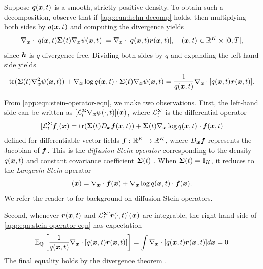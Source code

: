 Suppose $q(\boldsymbol{x}, t)$ is a smooth, strictly positive density.
To obtain such a decomposition, observe that if \cref{app:eqn:helm-decomp} holds, then multiplying both sides by $q(\boldsymbol{x}, t)$ and computing the divergence yields
\begin{equation}
     \nabla_{\boldsymbol{x}} \cdot [q(\boldsymbol{x}, t) \boldsymbol{\Sigma}(t) \nabla_{\boldsymbol{x}} \psi(\boldsymbol{x}, t)]
     =
     \nabla_{\boldsymbol{x}} \cdot [q(\boldsymbol{x}, t) \boldsymbol{r}(\boldsymbol{x}, t)],
     \quad
     (\boldsymbol{x}, t) \in \mathbb{R}^K \times [0, T],
\end{equation}
since $\boldsymbol{h}$ is $q$-divergence-free. 
Dividing both sides by $q$ and expanding the left-hand side yields
\begin{equation}\label{app:eqn:stein-operator-eqn}
    \mathrm{tr}(\boldsymbol{\Sigma}(t) \nabla_{\boldsymbol{x}}^2 \psi(\boldsymbol{x}, t))
    +
    \nabla_{\boldsymbol{x}} \log q(\boldsymbol{x}, t) \cdot
    \boldsymbol{\Sigma}(t) \nabla_{\boldsymbol{x}} \psi(\boldsymbol{x}, t)
    =
    \frac{1}{q(\boldsymbol{x}, t)}
    \nabla_{\boldsymbol{x}} \cdot [q(\boldsymbol{x}, t) \boldsymbol{r}(\boldsymbol{x}, t)] .
\end{equation}

From \cref{app:eqn:stein-operator-eqn}, we make two observations. First, the left-hand side can be written as $[\mathcal{L}_t^{\boldsymbol{\Sigma}}\nabla_{\boldsymbol{x}}\psi(\cdot,t)](\boldsymbol{x})$, where $\mathcal{L}_t^{\boldsymbol{\Sigma}}$ is the differential operator
\begin{equation}\label{app:eqn:diffusion-stein}
    [\mathcal{L}_t^{\boldsymbol{\Sigma}}\boldsymbol{f}](\boldsymbol{x}) = \mathrm{tr}(\boldsymbol{\Sigma}(t) D_{\boldsymbol{x}} \boldsymbol{f} (\boldsymbol{x}, t))
    +
    \boldsymbol{\Sigma}(t) \nabla_{\boldsymbol{x}} \log q(\boldsymbol{x}, t) \cdot
    \boldsymbol{f}(\boldsymbol{x}, t)
\end{equation}
defined for differentiable vector fields $\boldsymbol{f}: \mathbb{R}^K \to \mathbb{R}^K$, where $D_{\boldsymbol{x}} \boldsymbol{f}$ represents the Jacobian of $\boldsymbol{f}$.
This is the \emph{diffusion Stein operator} corresponding to the density $q(\boldsymbol{x},t)$ and constant covariance coefficient $\boldsymbol{\Sigma}(t)$ \citep{barbour1990stein,gorham2019measuring}. 
When $\boldsymbol{\Sigma}(t)=\mathbb{I}_K$, it reduces to the \emph{Langevin Stein} operator
\begin{equation*}
    [\cL_t \mbf](\mbx) = \nabla_{\mbx} \cdot \mbf(\mbx)  + \nabla_{\mbx} \log q(\mbx, t) \cdot \mbf(\mbx).
\end{equation*}
We refer the reader to \citet{gorham2019measuring} for background on diffusion Stein operators.

Second, whenever $\boldsymbol{r}(\boldsymbol{x}, t)$ and
$\mathcal{L}_t^{\boldsymbol{\Sigma}}[\boldsymbol{r}(\cdot, t)](\boldsymbol{x})$ are integrable, the right-hand side of \cref{app:eqn:stein-operator-eqn} has expectation
\begin{equation*}
    \mathbb{E}_{\mathbb{Q}}\left[
    \frac{1}{q(\boldsymbol{x}, t)}
    \nabla_{\boldsymbol{x}} \cdot [q(\boldsymbol{x}, t) \boldsymbol{r}(\boldsymbol{x}, t)]
    \right]
    =
    \int
    \nabla_{\boldsymbol{x}} \cdot [q(\boldsymbol{x}, t) \boldsymbol{r}(\boldsymbol{x}, t)]
    d \boldsymbol{x} = 0
\end{equation*}
The final equality holds by the divergence theorem \citep[][Theorem 3.1]{liu2026probabilistic}. 

